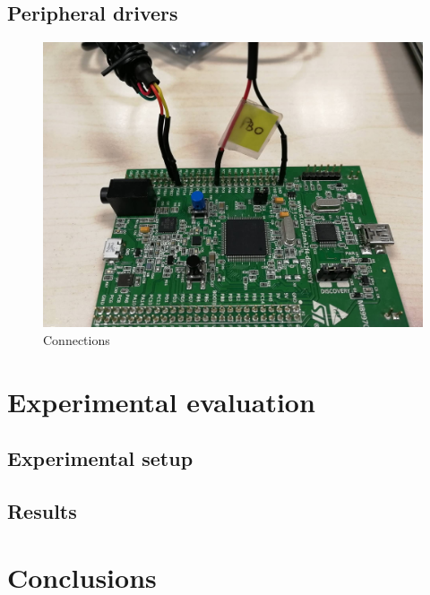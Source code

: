 \subsection{Peripheral drivers}
\cite{RefManual}
\begin{figure}[htbp]
  \centering
     \includegraphics[width=1\textwidth]{./figures/connections.jpg}
  \caption{Connections}
  \label{fig:connections}
\end{figure}

\section{Experimental evaluation}\label{Results}
\subsection{Experimental setup}
\subsection{Results}



\section{Conclusions}


